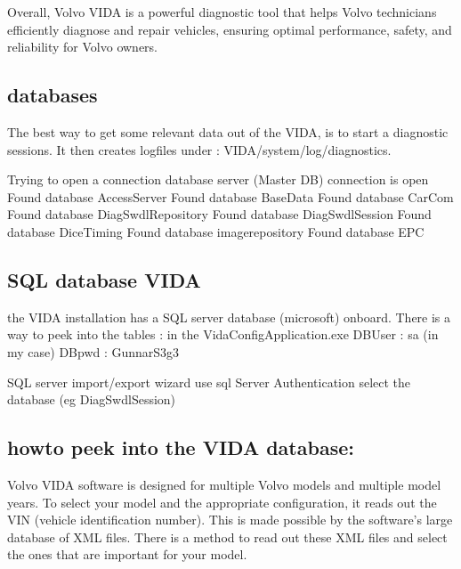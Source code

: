\documentclass[letterpaper,10pt,english]{sphinxmanual}
\begin{document}
\sphinxAtStartPar
Overall, Volvo VIDA is a powerful diagnostic tool that helps Volvo technicians efficiently diagnose and repair vehicles, ensuring optimal performance, safety, and reliability for Volvo owners.


\subsection{databases}
\label{\detokenize{software/vida:databases}}
\sphinxAtStartPar
The best way to get some relevant data out of the VIDA, is to start a diagnostic sessions. It then creates logfiles under : VIDA/system/log/diagnostics.

\begin{sphinxVerbatim}[commandchars=\\\{\}]
Trying to open a connection database server (Master DB)
 connection is open
Found database AccessServer
Found database BaseData
Found database CarCom
Found database DiagSwdlRepository
Found database DiagSwdlSession
Found database DiceTiming
Found database imagerepository
Found database EPC
\end{sphinxVerbatim}


\subsection{SQL database VIDA}
\label{\detokenize{software/vida:sql-database-vida}}
\sphinxAtStartPar
the VIDA installation has a SQL server database (microsoft) onboard.
There is a way to peek into the tables :
\sphinxhyphen{} in the VidaConfigApplication.exe
\sphinxhyphen{} DBUser :  sa  (in my case)
\sphinxhyphen{} DBpwd :  GunnarS3g3

\sphinxAtStartPar
SQL server import/export wizard
\sphinxhyphen{} use sql Server Authentication
\sphinxhyphen{} select the database (eg DiagSwdlSession)


\subsection{howto peek into the VIDA database:}
\label{\detokenize{software/vida:howto-peek-into-the-vida-database}}
\sphinxAtStartPar
Volvo VIDA software is designed for multiple Volvo models and multiple model years. To select your model and the appropriate configuration, it reads out the VIN (vehicle identification number). This is made possible by the software’s large database of XML files. There is a method to read out these XML files and select the ones that are important for your model.
\end{document}
